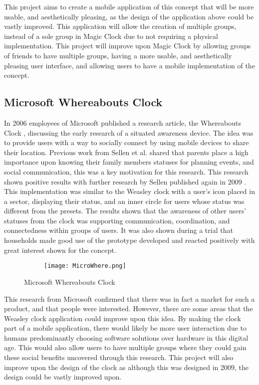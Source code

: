 This project aims to create a mobile application of this concept that will be more usable, and aesthetically pleasing, as the design of the application above could be vastly improved. This application will allow the creation of multiple groups, instead of a sole group in Magic Clock due to not requiring a physical implementation. This project will improve upon Magic Clock by allowing groups of friends to have multiple groups, having a more usable, and aesthetically pleasing user interface, and allowing users to have a mobile implementation of the concept.

\subsection{Microsoft Whereabouts Clock}

In 2006 employees of Microsoft published a research article, the Whereabouts Clock \cite{micrWher}, discussing the early research of a situated awareness device. The idea was to provide users with a way to socially connect by using mobile devices to share their location. Previous work from Sellen et al. \cite{sellen} shared that parents place a high importance upon knowing their family members statuses for planning events, and social communication, this was a key motivation for this research. This research shown positive results with further research by Sellen published again in 2009 \cite{sellen2009}. This implementation was similar to the Weasley clock with a user's icon placed in a sector, displaying their status, and an inner circle for users whose status was different from the presets. The results shown that the awareness of other users' statuses from the clock was supporting communication, coordination, and connectedness within groups of users. It was also shown during a trial that households made good use of the prototype developed and reacted positively with great interest shown for the concept.

\begin{figure}[!htbp]
    \centering
    \begin{subfigure}[b]{0.5\textwidth}
        {\texttt{[image: MicroWhere.png]}}
    \end{subfigure}
    \caption{Microsoft Whereabouts Clock}
    \label{fig:microWhere}
\end{figure}
\FloatBarrier

This research from Microsoft confirmed that there was in fact a market for such a product, and that people were interested. However, there are some areas that the Weasley clock application could improve upon this idea. By making the clock part of a mobile application, there would likely be more user interaction due to humans predominantly choosing software solutions over hardware in this digital age. This would also allow users to have multiple groups where they could gain these social benefits uncovered through this research. This project will also improve upon the design of the clock as although this was designed in 2009, the design could be vastly improved upon. 



